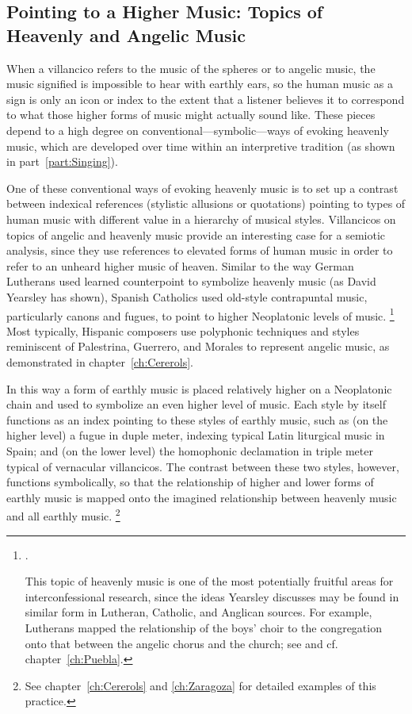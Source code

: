 \subsection{Pointing to a Higher Music: Topics of Heavenly and Angelic Music}

When a villancico refers to the music of the spheres or to angelic music, the music signified is impossible to hear with earthly ears, so the human music as a sign is only an icon or index to the extent that a listener believes it to correspond to what those higher forms of music might actually sound like.
These pieces depend to a high degree on conventional---symbolic---ways of evoking heavenly music, which are developed over time within an interpretive tradition (as shown in part~\ref{part:Singing}).

One of these conventional ways of evoking heavenly music is to set up a contrast between indexical references (stylistic allusions or quotations) pointing to types of human music with different value in a hierarchy of musical styles.
Villancicos on topics of angelic and heavenly music provide an interesting case for a semiotic analysis, since they use references to elevated forms of human music in order to refer to an unheard higher music of heaven.
Similar to the way German Lutherans used learned counterpoint to symbolize heavenly music (as David Yearsley has shown), Spanish Catholics used old-style contrapuntal music, particularly canons and fugues, to point to higher Neoplatonic levels of music.%
	\footnote{%
\autocites{Yearsley:Buxtehude}{Yearsley:BachThron}.

This topic of heavenly music is one of the most potentially fruitful areas for interconfessional research, since the ideas Yearsley discusses may be found in similar form in Lutheran, Catholic, and Anglican sources. 
For example, Lutherans mapped the relationship of the boys' choir to the congregation onto that between the angelic chorus and the church; see \autocite{Cashner:Gerhardt} and cf. chapter~\ref{ch:Puebla}.
	}
Most typically, Hispanic composers use polyphonic techniques and styles reminiscent of Palestrina, Guerrero, and Morales to represent angelic music, as demonstrated in chapter~\ref{ch:Cererols}.

In this way a form of earthly music is placed relatively higher on a Neoplatonic chain and used to symbolize an even higher level of music. 
Each style by itself functions as an index pointing to these styles of earthly music, such as (on the higher level) a fugue in duple meter, indexing typical Latin liturgical music in Spain; and (on the lower level) the homophonic declamation in triple meter typical of vernacular villancicos.
The contrast between these two styles, however, functions symbolically, so that the relationship of higher and lower forms of earthly music is mapped onto the imagined relationship between heavenly music and all earthly music.%
	\footnote{%
	See chapter~\ref{ch:Cererols} and \ref{ch:Zaragoza} for detailed examples of this practice.
	}

